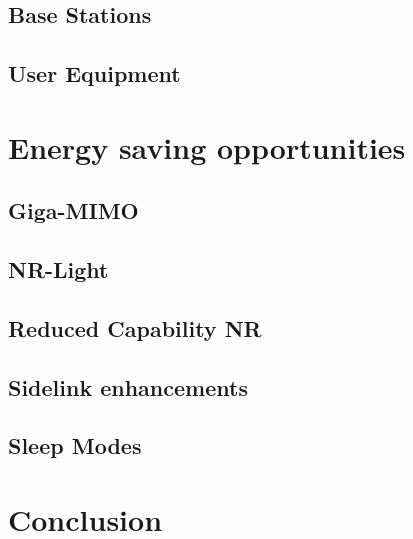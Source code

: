\documentclass[11pt,a4paper]{article}
\begin{document}
\subsection{Base Stations}\label{subsec:BSConsumption}


\subsection{User Equipment}\label{subsec:UEConsumption}


\section{Energy saving opportunities}\label{sec:opportunities}


\subsection{Giga-MIMO}\label{subsec:gigamimo}
\subsection{NR-Light}\label{subsec:nrlight}
\subsection{Reduced Capability NR}\label{subsec:RedCap}
\subsection{Sidelink enhancements}\label{subsec:sidelink}
\subsection{Sleep Modes}\label{subsec:sleep}

\section{Conclusion}\label{sec:conclusion}


\clearpage

\appendix
\glsaddall
\printnoidxglossary[type=\acronymtype,nonumberlist]

\nocite{*}
\renewcommand*{\refname}{\section{References}}
{}
\end{document}
